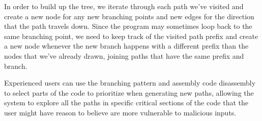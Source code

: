 In order to build up the tree, we iterate through each path we've visited and
create a new node for any new branching points and new edges for the direction
that the path travels down. Since the program may sometimes loop back to the
same branching point, we need to keep track of the visited path prefix and
create a new node whenever the new branch happens with a different prefix than
the nodes that we've already drawn, joining paths that have the same prefix and
branch.

Experienced users can use the branching pattern and assembly code disassembly to
select parts of the code to prioritize when generating new paths, allowing the
system to explore all the paths in specific critical sections of the code that
the user might have reason to believe are more vulnerable to malicious inputs.

